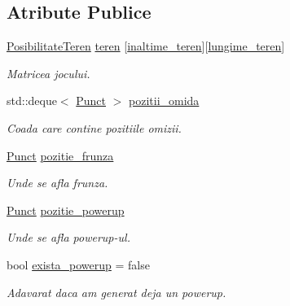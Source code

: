 \subsection*{Atribute Publice}
\begin{DoxyCompactItemize}
\item 
\hyperlink{main_8cpp_a67b02df562611307c1e3adeace56d13e}{Posibilitate\+Teren} \hyperlink{classStadiulJocului_a2e71823589e83f16593f8a2870c065e6}{teren} \mbox{[}\hyperlink{classStadiulJocului_a19203356f61f0f11191445347092bd3c}{inaltime\+\_\+teren}\mbox{]}\mbox{[}\hyperlink{classStadiulJocului_ab1b866a96905e3491008c1e7268d9983}{lungime\+\_\+teren}\mbox{]}
\begin{DoxyCompactList}\small\item\em Matricea jocului. \end{DoxyCompactList}\item 
std\+::deque$<$ \hyperlink{structPunct}{Punct} $>$ \hyperlink{classStadiulJocului_a64e0608d9c68b22ea83fd5aba209453f}{pozitii\+\_\+omida}
\begin{DoxyCompactList}\small\item\em Coada care contine pozitiile omizii. \end{DoxyCompactList}\item 
\mbox{\label{classStadiulJocului_a141067404f3678036ee7a91a02532a30}} 
\hyperlink{structPunct}{Punct} \hyperlink{classStadiulJocului_a141067404f3678036ee7a91a02532a30}{pozitie\+\_\+frunza}
\begin{DoxyCompactList}\small\item\em Unde se afla frunza. \end{DoxyCompactList}\item 
\hyperlink{structPunct}{Punct} \hyperlink{classStadiulJocului_a9e472dcc33fa67d1b5e000576133c3ac}{pozitie\+\_\+powerup}
\begin{DoxyCompactList}\small\item\em Unde se afla powerup-\/ul. \end{DoxyCompactList}\item 
\mbox{\label{classStadiulJocului_af47424386a19c4f87d45843896a39564}} 
bool \hyperlink{classStadiulJocului_af47424386a19c4f87d45843896a39564}{exista\+\_\+powerup} = false
\begin{DoxyCompactList}\small\item\em Adavarat daca am generat deja un powerup. \end{DoxyCompactList}\item 

\end{DoxyCompactItemize}
